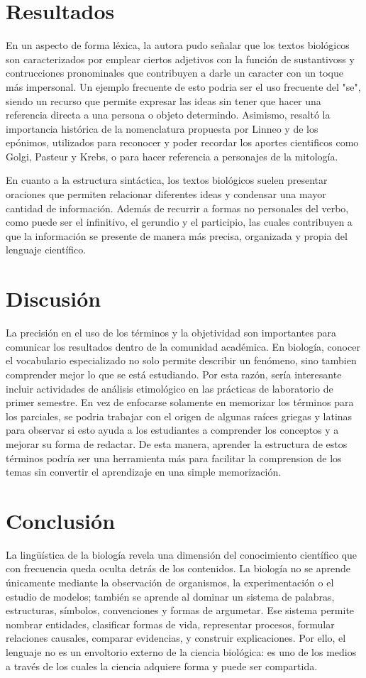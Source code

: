 \documentclass[12pt]{article}
\begin{document}
\section{Resultados}
En un aspecto de forma léxica, la autora pudo señalar que los textos biológicos son caracterizados por emplear ciertos adjetivos con la función de sustantivoss y contrucciones pronominales que contribuyen a darle un caracter con un toque más impersonal. Un ejemplo frecuente de esto podria ser el uso frecuente del "se", siendo un recurso que permite expresar las ideas sin tener que hacer una referencia directa a una persona o objeto determindo. Asimismo, resaltó la importancia histórica de la nomenclatura propuesta por Linneo y de los epónimos, utilizados para reconocer y poder recordar los aportes cientificos como Golgi, Pasteur y Krebs, o para hacer referencia a personajes de la mitología.

En cuanto a la estructura sintáctica, los textos biológicos suelen presentar oraciones que permiten relacionar diferentes ideas y condensar una mayor cantidad de información. Además de recurrir a formas no personales del verbo, como puede ser el infinitivo, el gerundio y el participio, las cuales contribuyen a que la información se presente de manera más precisa, organizada y propia del lenguaje científico.

\section{Discusión}
La precisión en el uso de los términos y la objetividad son importantes para comunicar los resultados dentro de la comunidad académica. En biología, conocer el vocabulario especializado no solo permite describir un fenómeno, sino tambien comprender mejor lo que se está estudiando. Por esta razón, sería interesante incluir actividades de análisis etimológico en las prácticas de laboratorio de primer semestre. En vez de enfocarse solamente en memorizar los términos para los parciales, se podria trabajar con el origen de algunas raíces griegas y latinas para observar si esto ayuda a los estudiantes a comprender los conceptos y a mejorar su forma de redactar. De esta manera, aprender la estructura de estos términos podría ser una herramienta más para facilitar la comprension de los temas sin convertir el aprendizaje en una simple memorización.

\section{Conclusión}
La lingüística de la biología revela una dimensión del conocimiento científico que con frecuencia queda oculta detrás de los contenidos. La biología no se aprende únicamente mediante la observación de organismos, la experimentación o el estudio de modelos; también se aprende al dominar un sistema de palabras, estructuras, símbolos, convenciones y formas de argumetar. Ese sistema permite nombrar entidades, clasificar formas de vida, representar procesos, formular relaciones causales, comparar evidencias, y construir explicaciones. Por ello, el lenguaje no es un envoltorio externo de la ciencia biológica: es uno de los medios a través de los cuales la ciencia adquiere forma y puede ser compartida.
\end{document}

